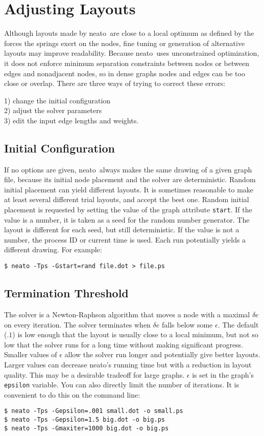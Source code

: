 \documentclass[11pt]{article}
\def\neato{{\sc neato}}
\begin{document}
\section{Adjusting Layouts}
Although layouts made by \neato\ are close to a local optimum
as defined by the forces the springs exert on the nodes,
fine tuning or generation of alternative layouts may improve readability.
Because \neato\ uses unconstrained optimization, it does not enforce
minimum separation constraints between nodes or between edges and
nonadjacent nodes, so in dense graphs nodes and edges can be too
close or overlap.  There are three ways of trying to correct these errors:
\begin{obeylines}
1) change the initial configuration
2) adjust the solver parameters
3) edit the input edge lengths and weights.
\end{obeylines}

\subsection{Initial Configuration}
If no options are given,
\neato\ always makes the same drawing of a given graph file,
because its initial node placement and the solver are deterministic.
Random initial placement can yield different layouts.
It is sometimes reasonable to make at least several different
trial layouts, and accept the best one.
Random initial placement is requested by setting the value of the
graph attribute \verb"start".
If the value is a number, it is taken as a seed for the random number
generator. The layout is different for each seed, but still deterministic.
If the value is not a number, the process ID or current time is used.
Each run potentially yields a different drawing.  For example:
\begin{verbatim}
$ neato -Tps -Gstart=rand file.dot > file.ps
\end{verbatim}

\subsection{Termination Threshold}
The solver is a Newton-Raphson algorithm that moves a node
with a maximal $\delta e$ on every iteration.
The solver terminates when $\delta e$ falls below some $\epsilon$.
The default ($.1$) is low enough that the layout is usually
close to a local minimum, but not so low that the solver runs
for a long time without making significant progress.
Smaller values of $\epsilon$ allow the solver run longer and 
potentially give better layouts.  Larger values can decrease
\neato's running time but with a reduction in layout quality.
This may be a desirable tradeoff for large graphs.
$\epsilon$ is set in the graph's \verb"epsilon" variable.
You can also directly limit the number of iterations.
It is convenient to do this on the command line:
\begin{verbatim}
$ neato -Tps -Gepsilon=.001 small.dot -o small.ps
$ neato -Tps -Gepsilon=1.5 big.dot -o big.ps
$ neato -Tps -Gmaxiter=1000 big.dot -o big.ps
\end{verbatim}
\end{document}
